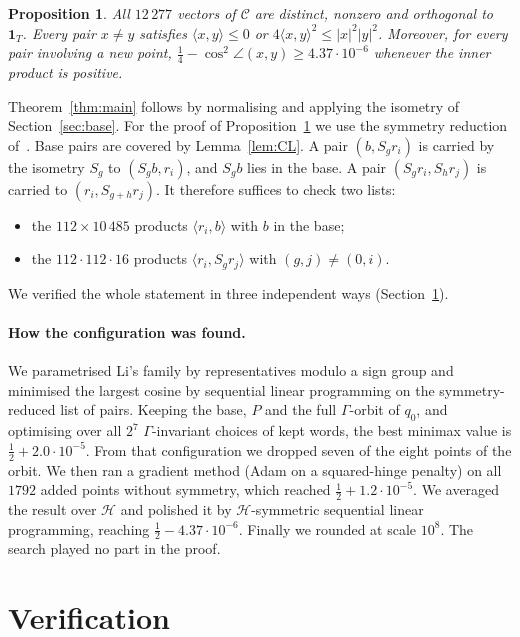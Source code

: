 \documentclass[11pt]{article}
\numberwithin{equation}{section}
\newtheorem{proposition}[theorem]{Proposition}
\theoremstyle{definition}
\theoremstyle{remark}
\begin{document}
\begin{proposition}\label{prop:check}
All $12\,277$ vectors of $\mathcal C$ are distinct, nonzero and orthogonal to $\mathbf 1_T$. Every
pair $x\ne y$ satisfies $\langle x,y\rangle\le0$ or $4\langle x,y\rangle^2\le|x|^2|y|^2$. Moreover,
for every pair involving a new point, $\tfrac14-\cos^2\angle(x,y)\ge 4.37\cdot10^{-6}$ whenever the
inner product is positive.
\end{proposition}
Theorem~\ref{thm:main} follows by normalising and applying the isometry of Section~\ref{sec:base}.
For the proof of Proposition~\ref{prop:check} we use the symmetry reduction of~\cite[\S3.3]{Li26b}.
Base pairs are covered by Lemma~\ref{lem:CL}. A pair $(b, S_g r_i)$ is carried by the isometry $S_g$
to $(S_gb, r_i)$, and $S_gb$ lies in the base. A pair $(S_gr_i,S_hr_j)$ is carried to
$(r_i,S_{g+h}r_j)$. It therefore suffices to check two lists:
\begin{itemize}
\item the $112\times10\,485$ products $\langle r_i,b\rangle$ with $b$ in the base;
\item the $112\cdot112\cdot16$ products $\langle r_i,S_gr_j\rangle$ with $(g,j)\neq(0,i)$.
\end{itemize}
We verified the whole statement in three independent ways (Section~\ref{sec:verif}).

\paragraph{How the configuration was found.} We parametrised Li's family by representatives modulo
a sign group and minimised the largest cosine by sequential linear programming on the
symmetry-reduced list of pairs. Keeping the base, $P$ and the full $\Gamma$-orbit of $q_0$, and
optimising over all $2^7$ $\Gamma$-invariant choices of kept words, the best minimax value is
$\tfrac12+2.0\cdot10^{-5}$. From that configuration we dropped seven of the eight points of the
orbit. We then ran a gradient method (Adam on a squared-hinge penalty) on all $1792$ added points
without symmetry, which reached $\tfrac12+1.2\cdot10^{-5}$. We averaged the result over
$\mathcal H$ and polished it by $\mathcal H$-symmetric sequential linear programming, reaching
$\tfrac12-4.37\cdot10^{-6}$. Finally we rounded at scale $10^8$. The search played no part in the
proof.

\section{Verification}\label{sec:verif}
\end{document}
